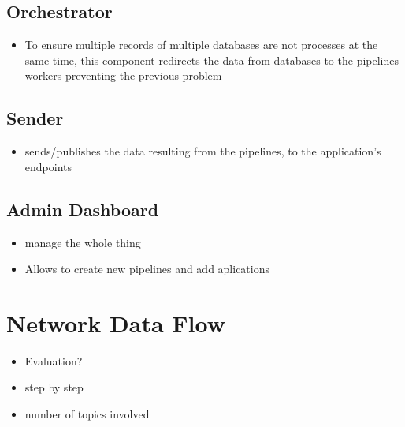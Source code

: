 \subsection{Orchestrator}
\begin{itemize}
    \item To ensure multiple records of multiple databases are not processes at the same time, this component redirects the data from databases to the pipelines workers preventing the previous problem
\end{itemize}
\subsection{Sender}
\begin{itemize}
    \item sends/publishes the data resulting from the pipelines, to the application's endpoints
\end{itemize}
\subsection{Admin Dashboard}
\begin{itemize}
    \item manage the whole thing
    \item Allows to create new pipelines and add aplications
\end{itemize}

\section{Network Data Flow}
\begin{itemize}
    \item Evaluation?
    \item step by step
    \item number of topics involved
\end{itemize}
